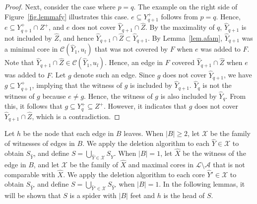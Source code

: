 \documentclass[11pt]{article}
\newcommand{\Afam}{\mathcal{A}}
\newcommand{\Cfam}{\mathcal{C}}
\newcommand{\Lfam}{\mathcal{L}}
\begin{document}
\begin{proof}
 Next, consider the case where $p=q$.
 The example on the right side of Figure~\ref{fig.lemmafy} illustrates this case.
 $e \subseteq Y^+_{q+1}$ follows from $p=q$.
 Hence, $e \subseteq Y^+_{q+1} \cap Z^+$, and $e$ does not cover
 $\hat{Y}_{q+1}\cap \hat{Z}$.
 By the maximality of $q$, $\hat{Y}_{q+1}$ is not included by $\hat{Z}$,
 and hence $\hat{Y}_{q+1}\cap \hat{Z}\subset \hat{Y}_{q+1}$.
 By Lemma~\ref{lem.afam}, $\hat{Y}_{q+1}$ was a minimal core in
 $\Cfam(\hat{Y}_1,u_{l})$
 that was not covered by $F$ when $e$ was added to $F$.
 Note that $\hat{Y}_{q+1}\cap \hat{Z} \in \Cfam(\hat{Y}_1,u_l)$.
 Hence, an edge in $F$ covered $\hat{Y}_{q+1}\cap \hat{Z}$
 when $e$ was added to $F$.
 Let $g$ denote such an edge.
 Since $g$ does not cover $\hat{Y}_{q+1}$,
 we have $g \subseteq Y^+_{q+1}$, implying that the witness of $g$ is
 included by $\hat{Y}_{q+1}$.
 $\hat{Y}_{q}$ is not the witness of $g$ because $e \neq g$.
 Hence, the witness of $g$ is also included by $\hat{Y}_{q}$.
 From this, it follows that $g \subseteq Y^+_{q} \subseteq Z^+$.
 However, it indicates that $g$ does not cover $\hat{Y}_{q+1} \cap \hat{Z}$,
 which is a contradiction.
 \end{proof}


Let $h$ be the node that each edge in $B$ leaves.
When $|B|\geq 2$, 
let $\mathcal{X}$ be the family of witnesses of edges in $B$.
We apply the deletion algorithm to each
$\hat{Y} \in \mathcal{X}$ to obtain $S_{\hat{Y}}$, and define $S=\bigcup_{\hat{Y}\in \mathcal{X}}S_{\hat{Y}}$.
When $|B|=1$,
let $\hat{X}$ be the witness of the edge in $B$,
and let $\mathcal{X}$ be the family of $\hat{X}$ and maximal cores in
$\Lfam \setminus \Afam$ that is not comparable with $\hat{X}$.
We apply the deletion algorithm to each core $\hat{Y}'\in \mathcal{X}$ to
obtain $S_{\hat{Y}'}$ and define $S=\bigcup_{\hat{Y}' \in \mathcal{X}}S_{\hat{Y}'}$
when $|B|=1$.
In the following lemmas, it will be shown that $S$ is a spider with 
$|B|$ feet and $h$ is the head of $S$.
\end{document}
